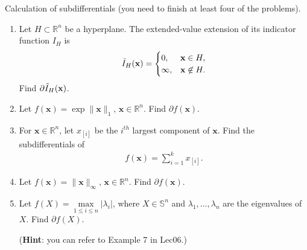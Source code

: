 \documentclass[11pt,letter,notitlepage]{article}
\begin{document}
\newpage
\begin{exercise}[Subdifferentials]
    Calculation of subdifferentials (you need to finish at least four of the problems).
        \begin{enumerate}
            \item Let $H\subset\mathbb{R}^n$ be a hyperplane. The extended-value extension of its indicator function $I_H$ is
            \begin{align*}
                \Tilde{I}_H(\textbf{x})=\begin{cases}
                    0,&\textbf{x}\in H,\\
                    \infty,&\textbf{x}\not\in H.
                \end{cases}
            \end{align*}
            Find $\partial \Tilde{I}_H(\textbf{x})$.

            \item Let $f(\textbf{x})=\exp{\|\textbf{x}\|_1},\, \textbf{x}\in\mathbb{R}^n$. Find $\partial f(\textbf{x})$.


            \item For $\textbf{x}\in\mathbb{R}^n$, let $x_{[i]}$ be the $i^{th}$ largest component of $\textbf{x}$. Find the subdifferentials of
            \begin{align*}
                f(\textbf{x})=\sum_{i=1}^k x_{[i]}.
            \end{align*}
            
            \item Let $f(\textbf{x})=\|\mathbf{x}\|_\infty,\, \textbf{x}\in\mathbb{R}^n$. Find $\partial f(\textbf{x})$.

            \item Let $f(X)=\max\limits_{1\le i\le n}|\lambda_i|$, where $X\in \mathbb{S}^n$ and $\lambda_1,\dots,\lambda_n$ are the eigenvalues of $X$. Find $\partial f(X)$.
            
            (\textbf{Hint}: you can refer to Example 7 in Lec06.)
     
    \end{enumerate}
\end{exercise}

\newpage



\end{document}

